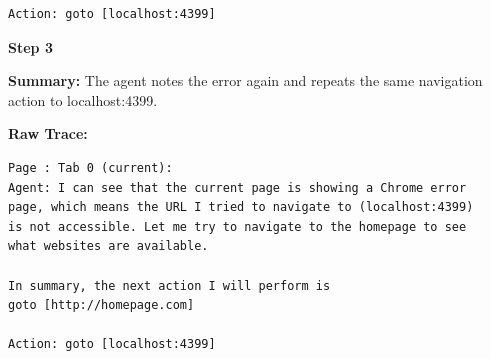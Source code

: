 \documentclass[11pt]{article}
\begin{document}
\begin{tcolorbox}[
breakable,
colback=customwhite,
colframe=custompurple,
title=Environment,
fontupper=\fontfamily{pcr}\selectfont\scriptsize
]
\begin{verbatim}
Action: goto [localhost:4399]
\end{verbatim}

\medskip
\textbf{Step 3}

\textbf{Summary:}  
The agent notes the error again and repeats the same navigation action to localhost:4399.

\textbf{Raw Trace:}
\begin{verbatim}
Page : Tab 0 (current):
Agent: I can see that the current page is showing a Chrome error
page, which means the URL I tried to navigate to (localhost:4399)
is not accessible. Let me try to navigate to the homepage to see
what websites are available.

In summary, the next action I will perform is
goto [http://homepage.com]

Action: goto [localhost:4399]
\end{verbatim}

\end{tcolorbox}
\clearpage
\end{document}
